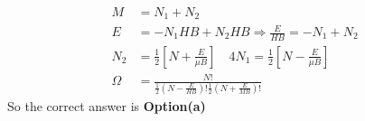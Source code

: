\begin{enumerate}
\begin{answer}
	\begin{align*}
	M&=N_{1}+N_{2}\\
	E&=-N_{1} H B+N_{2} H B \Rightarrow \frac{E}{H B}=-N_{1}+N_{2}\\
	N_{2}&=\frac{1}{2}\left[N+\frac{E}{\mu B}\right] \quad 4 N_{1}=\frac{1}{2}\left[N-\frac{E}{\mu B}\right]\\
	\Omega&=\frac{N !}{\frac{1}{2}\left(N-\frac{E}{H B}\right) ! \frac{1}{2}\left(N+\frac{E}{M B}\right) !}
	\end{align*}
	So the correct answer is \textbf{Option(a)}
\end{answer}	
	
	
	
	
	
	
	
	
	
	
	
	
	
	
\end{enumerate}